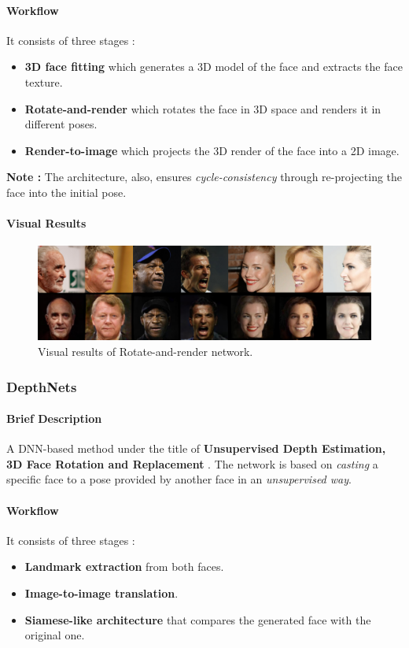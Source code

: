 \paragraph{Workflow}
It consists of three stages : 
\begin{itemize}
    \item \textbf{3D face fitting} which generates a 3D model of the face and extracts the face texture.
    \item \textbf{Rotate-and-render} which rotates the face in 3D space and renders it in different poses.
    \item \textbf{Render-to-image} which projects the 3D render of the face into a 2D image.
\end{itemize}
\textbf{Note :} The architecture, also, ensures \emph{cycle-consistency} through re-projecting the face into the initial pose.

\paragraph{Visual Results}
\begin{figure}[H]
    \centering
    \includegraphics[width=\textwidth]{images/rotate-and-render.png}
    \caption{Visual results of Rotate-and-render network.}
    \label{fig:r&r}
\end{figure}

\subsubsection{DepthNets}

\paragraph{Brief Description}
A DNN-based method under the title of \textbf{Unsupervised Depth Estimation, 3D Face Rotation and Replacement} \cite{moniz2018unsupervised}. The network is based on \emph{casting} a specific face to a pose provided by another face in an \emph{unsupervised way}.

\paragraph{Workflow}
It consists of three stages :
\begin{itemize}
    \item \textbf{Landmark extraction} from both faces.
    \item \textbf{Image-to-image translation}.
    \item \textbf{Siamese-like architecture} that compares the generated face with the original one.
\end{itemize}

